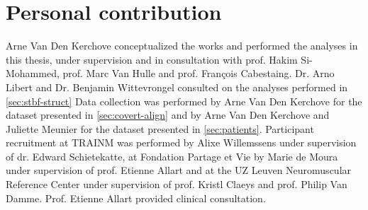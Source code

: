 \chapter*{Personal contribution}
Arne Van Den Kerchove conceptualized the works and performed the analyses in
this thesis, under supervision and in consultation with prof. Hakim Si-Mohammed,
prof. Marc Van Hulle and prof. François Cabestaing.
Dr. Arno Libert and Dr. Benjamin Wittevrongel consulted on the analyses performed in
\cref{sec:stbf-struct}
Data collection was performed by Arne Van Den Kerchove for the dataset
presented in \cref{sec:covert-align} and by Arne Van Den Kerchove and
Juliette Meunier for the dataset presented in \cref{sec:patients}.
Participant recruitment at TRAINM was performed by Alixe Willemssens under
supervision of dr. Edward Schietekatte, at Fondation Partage et Vie by Marie de
Moura under supervision of prof. Etienne Allart and at the UZ Leuven Neuromuscular
Reference Center under supervision of prof. Kristl Claeys and prof. Philip Van Damme.
Prof. Etienne Allart provided clinical consultation.
